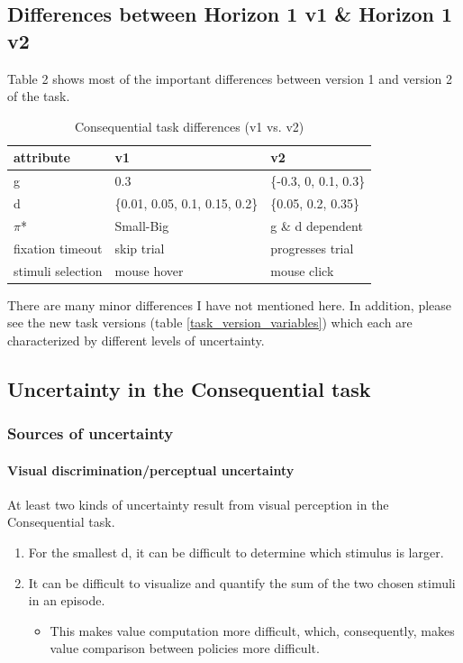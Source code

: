 \documentclass[11pt]{article}
\begin{document}
\subsection{Differences between Horizon 1 v1 \& Horizon 1 v2}
\label{sec:org74719e6}
Table 2 shows most of the important differences between version 1 and version 2 of the task.
\begin{table}[htbp]
\caption{\label{Table 2}Consequential task differences (v1 vs. v2)}
\centering
\begin{tabular}{lll}
attribute & v1 & v2\\
\hline
g & 0.3 & \{-0.3, 0, 0.1, 0.3\}\\
d & \{0.01, 0.05, 0.1, 0.15, 0.2\} & \{0.05, 0.2, 0.35\}\\
\(\pi\)* & Small-Big & g \& d dependent\\
fixation timeout & skip trial & progresses trial\\
stimuli selection & mouse hover & mouse click\\
\end{tabular}
\end{table}
There are many minor differences I have not mentioned here. In addition, please see the new task versions (table \ref{task_version_variables}) which each are characterized by different levels of uncertainty.
\subsection{Uncertainty in the Consequential task}
\label{sec:org3e080e3}
\subsubsection{Sources of uncertainty}
\label{sec:orga36c981}
\paragraph{Visual discrimination/perceptual uncertainty}
\label{sec:orgcf736e2}
At least two kinds of uncertainty result from visual perception in the Consequential task.
\begin{enumerate}
\item For the smallest d, it can be difficult to determine which stimulus is larger.
\item It can be difficult to visualize and quantify the sum of the two chosen stimuli in an episode.
\begin{itemize}
\item This makes value computation more difficult, which, consequently, makes value comparison between policies more difficult.
\end{itemize}
\end{enumerate}
\end{document}
